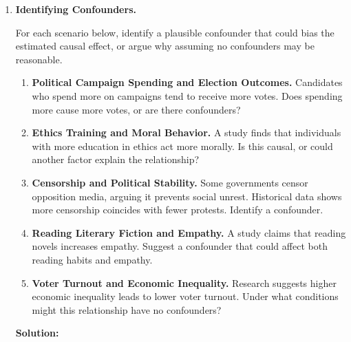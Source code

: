 \documentclass[12pt]{article}
\newif\ifsolutions
\begin{document}
\begin{enumerate}
\fi \color{black}

\item \textbf{Identifying Confounders.}

For each scenario below, identify a plausible confounder that could bias the estimated causal effect, or argue why assuming no confounders may be reasonable.

\begin{enumerate}[label=(\alph*)]
    \item \textbf{Political Campaign Spending and Election Outcomes.}  
    Candidates who spend more on campaigns tend to receive more votes. Does spending more cause more votes, or are there confounders?  
    \item \textbf{Ethics Training and Moral Behavior.} 
    A study finds that individuals with more education in ethics act more morally. Is this causal, or could another factor explain the relationship?  
    \item \textbf{Censorship and Political Stability.}  
    Some governments censor opposition media, arguing it prevents social unrest. Historical data shows more censorship coincides with fewer protests. Identify a confounder.  
    \item \textbf{Reading Literary Fiction and Empathy.}  
    A study claims that reading novels increases empathy. Suggest a confounder that could affect both reading habits and empathy.  
    \item \textbf{Voter Turnout and Economic Inequality.}  
    Research suggests higher economic inequality leads to lower voter turnout. Under what conditions might this relationship have no confounders?  
\end{enumerate}

\ifsolutions \color{blue} \textbf{Solution:} \\


\end{enumerate}
\end{document}

